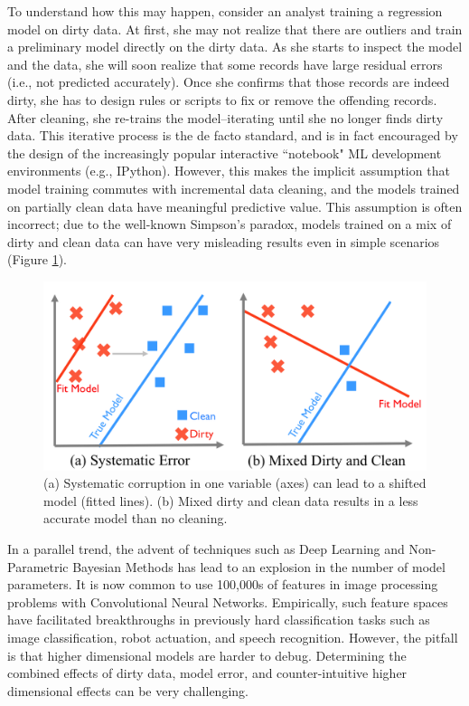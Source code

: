 To understand how this may happen, consider an analyst training a regression model on dirty data. 
At first, she may not realize that there are outliers and train a preliminary model directly on the dirty data. 
As she starts to inspect the model and the data, she will soon realize that some records have large residual errors (i.e., not predicted accurately). 
Once she confirms that those records are indeed dirty, she has to design rules or scripts to fix or remove the offending records. 
After cleaning, she re-trains the model--iterating until she no longer finds dirty data.
This iterative process is the de facto standard, and is in fact encouraged by the design of the increasingly popular interactive ``notebook" ML development environments (e.g., IPython).
However, this makes the implicit assumption that model training commutes with incremental data cleaning, and the models trained on partially clean data have meaningful predictive value.
This assumption is often incorrect; due to the well-known Simpson's paradox, models trained on a mix of dirty and clean data can have very misleading results even in simple scenarios (Figure \ref{update-arch1}).

\begin{figure}[t]
\centering
 \includegraphics[width=0.7\columnwidth]{figs/update-arch.png}
 \caption{(a) Systematic corruption in one variable (axes) can lead to a shifted model (fitted lines). 
 (b) Mixed dirty and clean data results in a less accurate model than no cleaning.\label{update-arch1}}\vspace{-2em}
\end{figure}

In a parallel trend, the advent of techniques such as Deep Learning and Non-Parametric Bayesian Methods has lead to an explosion in the number of model parameters.
It is now common to use 100,000s of features in image processing problems with Convolutional Neural Networks.
Empirically, such feature spaces have facilitated breakthroughs in previously hard classification tasks such as image classification, robot actuation, and speech recognition.
However, the pitfall is that higher dimensional models are harder to debug.
Determining the combined effects of dirty data, model error, and counter-intuitive higher dimensional effects can be very challenging.

